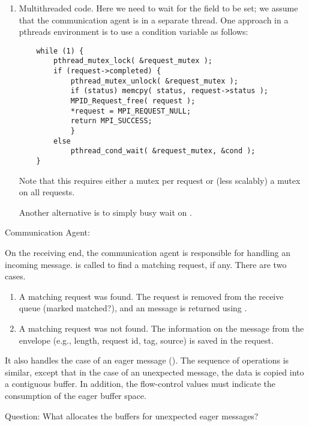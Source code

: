 \begin{mmadi}
\begin{tcp}
\begin{enumerate}
\item Multithreaded code.  Here we need to wait for the
   field to be set; we assume that the
  communication agent is in a separate thread.  One approach in a pthreads
  environment is to use a 
  condition variable as follows:
\begin{verbatim}
    while (1) {
        pthread_mutex_lock( &request_mutex );
        if (request->completed) {
            pthread_mutex_unlock( &request_mutex );
            if (status) memcpy( status, request->status );
            MPID_Request_free( request );
            *request = MPI_REQUEST_NULL;
            return MPI_SUCCESS;
            }
        else 
            pthread_cond_wait( &request_mutex, &cond );
    }
\end{verbatim}  
Note that this requires either a mutex per request or (less scalably) a mutex
on all requests.

Another alternative is to simply busy wait on .
\end{enumerate}

Communication Agent:

On the receiving end, the communication agent is responsible for handling an
incoming  message.  
 is called to find a matching request, if
any.  There are two cases.
\begin{enumerate}
\item A matching request was found.  The request is removed from the receive
  queue (marked matched?), and an  message is
  returned using .
\item A matching request was not found.  The information on the message from
  the envelope (e.g., length, request id, tag, source) is saved in the
  request. 
\end{enumerate}

It also handles the case of an eager message ().
The sequence of operations is similar, except that in the case of an
unexpected message, the data is copied into a contiguous buffer.  In addition,
the flow-control values must indicate the consumption of the eager buffer
space.  

Question: What allocates the buffers for unexpected eager messages?


\end{tcp}
\end{mmadi}
